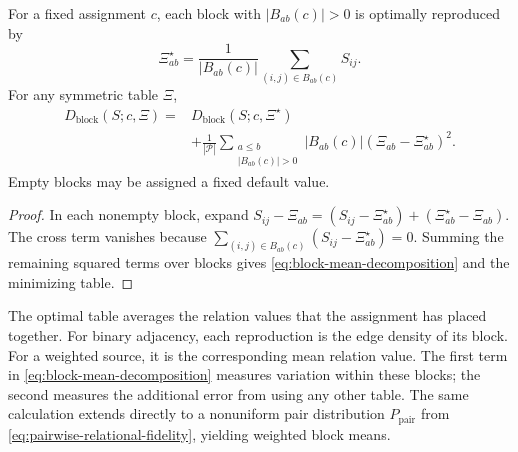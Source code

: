 \begin{proposition}
\label{prop:block-means}
For a fixed assignment $c$, each block with $|B_{ab}(c)|>0$ is optimally reproduced by
\begin{equation}
\Xi_{ab}^\star
=\frac{1}{|B_{ab}(c)|}
\sum_{(i,j)\in B_{ab}(c)}S_{ij}.
\label{eq:block-optimal-mean}
\end{equation}
For any symmetric table $\Xi$,
\begin{equation}
\begin{aligned}
D_{\mathrm{block}}(S;c,\Xi)
={}&D_{\mathrm{block}}(S;c,\Xi^\star)\\
&+\frac{1}{|\mathcal P|}
\sum_{\substack{a\le b\\|B_{ab}(c)|>0}}
|B_{ab}(c)|(\Xi_{ab}-\Xi_{ab}^\star)^2.
\end{aligned}
\label{eq:block-mean-decomposition}
\end{equation}
Empty blocks may be assigned a fixed default value.
\end{proposition}

\begin{proof}
In each nonempty block, expand
$S_{ij}-\Xi_{ab}=(S_{ij}-\Xi_{ab}^\star)+(\Xi_{ab}^\star-\Xi_{ab})$.
The cross term vanishes because
$\sum_{(i,j)\in B_{ab}(c)}(S_{ij}-\Xi_{ab}^\star)=0$.
Summing the remaining squared terms over blocks gives \cref{eq:block-mean-decomposition} and the minimizing table.
\end{proof}

The optimal table averages the relation values that the assignment has placed together.
For binary adjacency, each reproduction is the edge density of its block.
For a weighted source, it is the corresponding mean relation value.
The first term in \cref{eq:block-mean-decomposition} measures variation within these blocks; the second measures the additional error from using any other table.
The same calculation extends directly to a nonuniform pair distribution $P_{\mathrm{pair}}$ from \cref{eq:pairwise-relational-fidelity}, yielding weighted block means.

